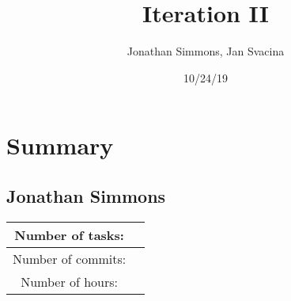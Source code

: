 \documentclass{article}
\title{Iteration II}
\date{10/24/19}
\author{Jonathan Simmons, Jan Svacina}
\begin{document}
    \maketitle

    

    

    

    

    

    

    

    

    

    


    \section*{Summary}


    \subsection*{Jonathan Simmons}

    \begin{center}
        \begin{tabular}{||c c ||}
            \hline
            Number of tasks: &  \\
            \hline
            Number of commits: &  \\
            \hline
            Number of hours: &  \\
            \hline
        \end{tabular}
    \end{center}
\end{document}
